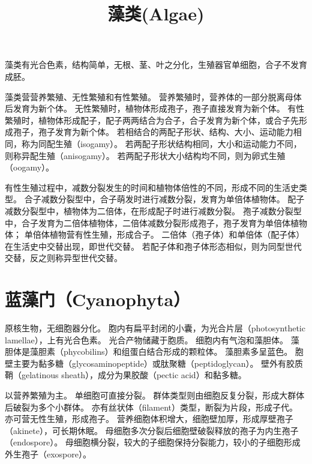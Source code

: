 \documentclass[11pt]{article}
\title{藻类(Algae)}
\date{}
\begin{document}
  \maketitle

  \linenumbers
藻类有光合色素，结构简单，无根、茎、叶之分化，生殖器官单细胞，合子不发育成胚。

\newline

藻类营营养繁殖、无性繁殖和有性繁殖。
营养繁殖时，营养体的一部分脱离母体后发育为新个体。
无性繁殖时，植物体形成孢子，孢子直接发育为新个体。
有性繁殖时，植物体形成配子，配子两两结合为合子，合子发育为新个体，或合子先形成孢子，孢子发育为新个体。
若相结合的两配子形状、结构、大小、运动能力相同，称为同配生殖（isogamy）。
若两配子形状结构相同，大小和运动能力不同，则称异配生殖（anisogamy）。
若两配子形状大小结构均不同，则为卵式生殖（oogamy）。

\newline

有性生殖过程中，减数分裂发生的时间和植物体倍性的不同，形成不同的生活史类型。
合子减数分裂型中，合子萌发时进行减数分裂，发育为单倍体植物体。
配子减数分裂型中，植物体为二倍体，在形成配子时进行减数分裂。
孢子减数分裂型中，合子发育为二倍体植物体，二倍体减数分裂形成孢子，孢子发育为单倍体植物体；
单倍体植物营有性生殖，形成合子。
二倍体（孢子体）和单倍体（配子体）在生活史中交替出现，即世代交替。
若配子体和孢子体形态相似，则为同型世代交替，反之则称异型世代交替。

\section{蓝藻门（Cyanophyta）}
原核生物，无细胞器分化。
胞内有扁平封闭的小囊，为光合片层（photosynthetic lamellae），上有光合色素。
光合产物储藏于胞质。
细胞内有气泡和藻胆体。
藻胆体是藻胆素（phycobilins）和组蛋白结合形成的颗粒体。
藻胆素多呈蓝色。
胞壁主要为黏多糖（glycosaminopeptide）或肽聚糖（peptidoglycan）。
壁外有胶质鞘（gelatinous sheath），成分为果胶酸（pectic acid）和黏多糖。

\newline

以营养繁殖为主。
单细胞可直接分裂。
群体类型则由细胞反复分裂，形成大群体后破裂为多个小群体。
亦有丝状体（filament）类型，断裂为片段，形成子代。
亦可营无性生殖，形成孢子。
营养细胞体积增大，细胞壁加厚，形成厚壁孢子（akinete），可长期休眠。
母细胞多次分裂后细胞壁破裂释放的孢子为内生孢子（endospore）。
母细胞横分裂，较大的子细胞保持分裂能力，较小的子细胞形成外生孢子（exospore）。
\end{document}
